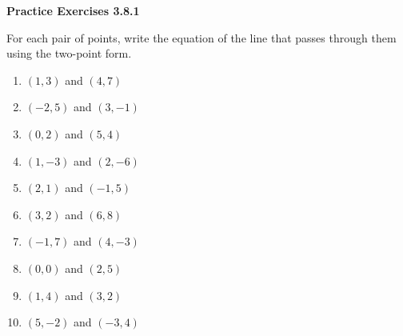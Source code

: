  \vspace{1ex}
\noindent\textbf{Practice Exercises 3.8.1}

\vspace{0.75ex}

For each pair of points, write the equation of the line that passes through them using the two-point form.
\begin{multicols}{2}
\begin{enumerate}[noitemsep, label = \color{blue}\arabic*. ]
    \item $(1, 3)$ and $(4, 7)$
    \item $(-2, 5)$ and $(3, -1)$
    \item $(0, 2)$ and $(5, 4)$
    \item $(1, -3)$ and $(2, -6)$
    \item $(2, 1)$ and $(-1, 5)$
    \item $(3, 2)$ and $(6, 8)$
    \item $(-1, 7)$ and $(4, -3)$
    \item $(0, 0)$ and $(2, 5)$
    \item $(1, 4)$ and $(3, 2)$
    \item $(5, -2)$ and $(-3, 4)$
\end{enumerate}
\end{multicols}


